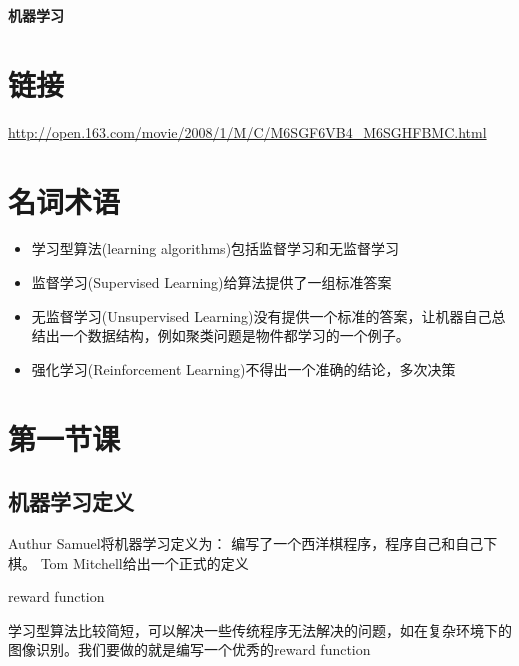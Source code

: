 \documentclass[a4paper,12pt]{ctexart}
\begin{document}
\begin{center}
\huge \textbf{机器学习}
\end{center}

\tableofcontents
\newpage

\section{链接}
\url{http://open.163.com/movie/2008/1/M/C/M6SGF6VB4_M6SGHFBMC.html}

\section{名词术语}
\begin{itemize}
  \item 学习型算法(learning algorithms)\-包括监督学习和无监督学习
  \item 监督学习(Supervised Learning)\-给算法提供了一组标准答案
  \item 无监督学习(Unsupervised Learning)\-没有提供一个标准的答案，让机器自己总结出一个数据结构，例如聚类问题是物件都学习的一个例子。
  \item 强化学习(Reinforcement Learning)\-不得出一个准确的结论，多次决策
\end{itemize}

\section{第一节课}
\subsection{机器学习定义}
Authur Samuel将机器学习定义为：
编写了一个西洋棋程序，程序自己和自己下棋。
Tom Mitchell给出一个正式的定义

reward function

学习型算法比较简短，可以解决一些传统程序无法解决的问题，如在复杂环境下的图像识别。我们要做的就是编写一个优秀的reward function
\end{document}
